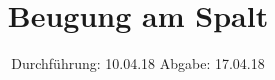 

\subject{V406}
\title{Beugung am Spalt}
\date{
  Durchführung: 10.04.18
  \hspace{3em}
  Abgabe: 17.04.18
}



\maketitle
\thispagestyle{empty}
\tableofcontents
\newpage








\newpage
\printbibliography


